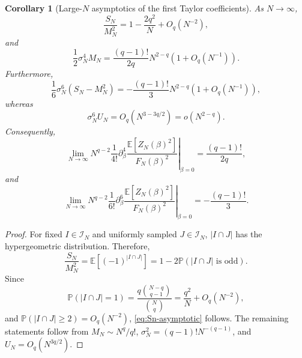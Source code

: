 \documentclass[11pt]{article}
\newtheorem{corollary}[proposition]{Corollary}
\newcommand{\E}{\mathbb{E}}
\newcommand{\calI}{\mathcal{I}}
\begin{document}
\begin{corollary}[Large-$N$ asymptotics of the first Taylor coefficients]
  \label{cor:Zn2-large-n-Taylor-coefficients}
  As $N\to\infty$,
  \begin{equation}\label{eq:Sn-asymptotic}
    \frac{S_N}{M_N^2}
    =
    1-\frac{2q^2}{N}+O_q(N^{-2}),
  \end{equation}
  and
  \begin{equation}\label{eq:Zn2-beta4-coefficient}
    \frac12\sigma_N^4M_N
    =
    \frac{(q-1)!}{2q}
    N^{2-q}
    \left(
      1+O_q(N^{-1})
    \right).
  \end{equation}
  Furthermore,
  \begin{equation}\label{eq:Zn2-beta6-second-chaos-coefficient}
    \frac16\sigma_N^6
    \left(
      S_N-M_N^2
    \right)
    =
    -\frac{(q-1)!}{3}
    N^{2-q}
    \left(
      1+O_q(N^{-1})
    \right),
  \end{equation}
  whereas
  \begin{equation}\label{eq:Zn2-beta6-third-chaos-coefficient}
    \sigma_N^6U_N
    =
    O_q\left(N^{3-3q/2}\right)
    =
    o\left(N^{2-q}\right).
  \end{equation}
  Consequently,
  \begin{equation}\label{eq:Zn2-fourth-derivative-limit}
    \lim_{N\to\infty}
    N^{q-2}\frac1{4!}
    \left.
      \partial_\beta^4
      \frac{\E[Z_N(\beta)^2]}{F_N(\beta)^2}
    \right|_{\beta=0}
    =
    \frac{(q-1)!}{2q},
  \end{equation}
  and
  \begin{equation}\label{eq:Zn2-sixth-derivative-limit}
    \lim_{N\to\infty}
    N^{q-2}\frac1{6!}
    \left.
      \partial_\beta^6
      \frac{\E[Z_N(\beta)^2]}{F_N(\beta)^2}
    \right|_{\beta=0}
    =
    -\frac{(q-1)!}{3}.
  \end{equation}
\end{corollary}

\begin{proof}
  For fixed $I\in\calI_N$ and uniformly sampled $J\in\calI_N$,
  $|I\cap J|$ has the hypergeometric distribution.  Therefore,
  \begin{equation}\label{eq:sign-hypergeometric}
    \frac{S_N}{M_N^2}
    =
    \E\left[(-1)^{|I\cap J|}\right]
    =
    1-2\mathbb P(|I\cap J|\text{ is odd}).
  \end{equation}
  Since
  \begin{equation}\label{eq:intersection-one-asymptotic}
    \mathbb P(|I\cap J|=1)
    =
    \frac{q\binom{N-q}{q-1}}{\binom Nq}
    =
    \frac{q^2}{N}+O_q(N^{-2}),
  \end{equation}
  and $\mathbb P(|I\cap J|\geq2)=O_q(N^{-2})$,
  \eqref{eq:Sn-asymptotic} follows.  The remaining statements follow from
  $M_N\sim N^q/q!$, $\sigma_N^2=(q-1)!N^{-(q-1)}$, and
  $U_N=O_q(N^{3q/2})$.
\end{proof}
\end{document}
